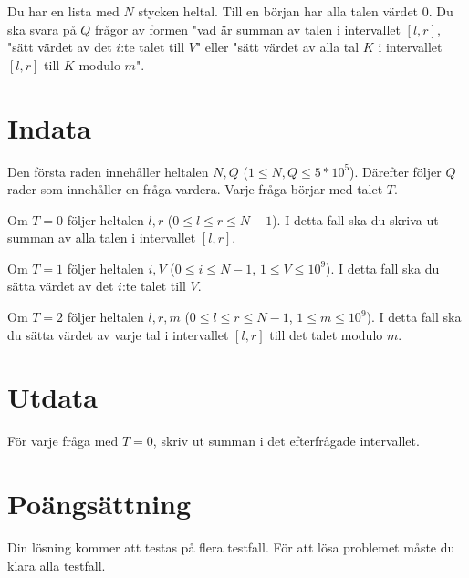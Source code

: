 Du har en lista med $N$ stycken heltal. Till en början har alla talen värdet $0$. Du ska svara på $Q$
frågor av formen "vad är summan av talen i intervallet $[l,r]$,
"sätt värdet av det $i$:te talet till $V$" eller "sätt värdet av alla tal $K$ i intervallet $[l,r]$
till $K$ modulo $m$".

\section*{Indata}
Den första raden innehåller heltalen $N, Q$ ($1 \leq N, Q \leq 5*10^5$).
Därefter följer $Q$ rader som innehåller en fråga vardera. Varje fråga börjar med talet $T$.

Om $T=0$ följer heltalen $l,r$ ($0 \leq l \leq r \leq N - 1$). I detta fall ska du skriva ut summan av alla talen i intervallet $[l,r]$.

Om $T=1$ följer heltalen $i, V$ ($0 \leq i \leq N - 1$, $1 \leq V \leq 10^9$). I detta fall ska du sätta värdet av det $i$:te talet till $V$.

Om $T=2$ följer heltalen $l,r,m$ ($0 \leq l \leq r \leq N-1$, $1 \leq m \leq 10^9$). I detta fall ska du sätta värdet av varje tal i intervallet $[l,r]$ till det talet modulo $m$.

\section*{Utdata}
För varje fråga med $T=0$, skriv ut summan i det efterfrågade intervallet.

\section*{Poängsättning}
Din lösning kommer att testas på flera testfall.
\noindent
För att lösa problemet måste du klara alla testfall.
